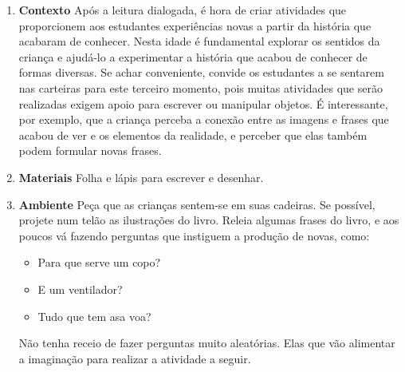 \documentclass[11pt]{extarticle}
\begin{document}


\begin{enumerate}
\item \textbf{Contexto}\quad 
Após a leitura dialogada, é hora de criar 
atividades que proporcionem aos estudantes experiências novas a partir da história 
que acabaram de conhecer. Nesta idade é fundamental explorar os sentidos da criança e 
ajudá-lo a experimentar a história que acabou de conhecer de formas diversas. Se achar 
conveniente, convide os estudantes a se sentarem nas carteiras para este terceiro 
momento, pois muitas atividades que serão realizadas exigem apoio para escrever 
ou manipular objetos. É interessante, por exemplo, que a criança perceba a conexão 
entre as imagens e frases que acabou de ver e os elementos da realidade, e perceber
que elas também podem formular novas frases.

\item \textbf{Materiais}\quad 
Folha e lápis para escrever e desenhar.

\item \textbf{Ambiente}\quad 
Peça que as crianças sentem-se em suas cadeiras.
Se possível, projete num telão as ilustrações do livro. 
Releia algumas frases do livro, e aos poucos vá 
fazendo perguntas que instiguem a produção de novas, como: 

\begin{itemize}
	\item Para que serve um copo? 
	\item E um ventilador? 
	\item Tudo que tem asa voa?
\end{itemize}

Não tenha receio de fazer perguntas muito aleatórias. 
Elas que vão alimentar a imaginação para realizar a atividade a seguir.



\end{enumerate}
\end{document}
